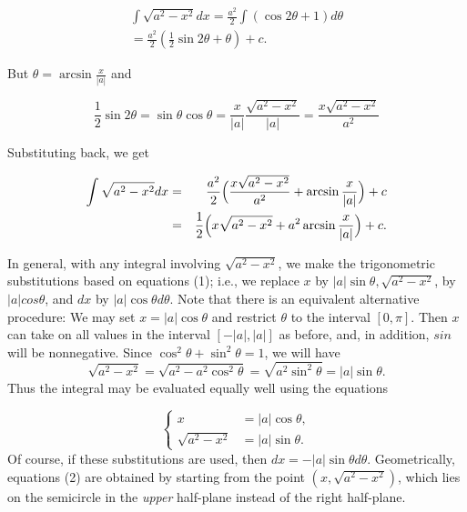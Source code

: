\begin{eqnarray*}
\int \sqrt{a^2 - x^2} dx = \frac{a^2}{2} \int (\cos 2\theta + 1) d\theta \\
= \frac{a^2}{2} (\frac{1}{2} \sin 2\theta + \theta) + c.
\end{eqnarray*}

\noindent But $\theta = \arcsin \frac{x}{|a|}$ and

$$
\frac{1}{2} \sin 2\theta = \sin \theta \cos \theta = \frac{x}{|a|} \frac{\sqrt {a^2 - x^2}}{|a|}  = \frac{x \sqrt{a^2 - x^2}}{a^2} 
$$

\noindent Substituting back, we get 

\begin{eqnarray*}
\int \sqrt{a^2 - x^2}dx 
&=& \frac{a^2}{2} \Bigl( \frac{x \sqrt{a^2 - x^2}}{a^2} + \arcsin \frac{x}{|a|} \Bigr) + c\\
&=& \frac{1}{2} \Bigl( x \sqrt{a^2 - x^2} + a^{2} \arcsin \frac{x}{|a|} \Bigr ) + c.
\end{eqnarray*}

In general, with any integral involving $\sqrt{a^2 - x^2}$, we make the trigonometric substitutions based on equations (1); i.e., we replace $x$ by $|a| \sin \theta, \sqrt{a^2 - x^2}$, by $|a| cos \theta$, and $dx$ by $|a| \cos \theta d\theta$. Note that there is an equivalent alternative procedure: We may set $x = |a| \cos \theta$ and restrict $\theta$ to the interval $[0, \pi]$. Then $x$ can take on all values in the interval $[-|a|, |a|]$ as
before, and, in addition, $sin $ will be nonnegative. Since $\cos^{2}\theta + \sin^{2}\theta = 1$, we will have
$$
\sqrt{a^2 - x^2} = \sqrt{a^2 - a^{2}\cos^{2}\theta} = \sqrt{a^{2} \sin^{2} \theta}
 = |a| \sin \theta.
$$
\noindent Thus the integral may be evaluated equally well using the equations


\begin{equation}
\left \{ 
\begin{array}{rl}
                      x &= |a| \cos \theta,  \\
\sqrt{a^2 - x^2} &= |a| \sin \theta.
\end{array}
\right.
\label{eq7.3.2}
\end{equation}
\noindent Of course, if these substitutions are used, then $dx = - |a| \sin \theta d\theta$. Geometrically, equations (2) are obtained by starting from the point $(x, \sqrt{a^2 - x^2})$, which lies on the semicircle in the \textit{upper} half-plane instead of the right half-plane.

